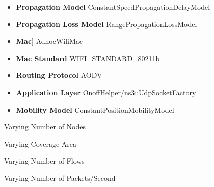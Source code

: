 \documentclass{article}[12pt]
\begin{document}
\begin{itemize}
	
	\item{\textbf{Propagation Model} ConstantSpeedPropagationDelayModel}
	\item{\textbf{Propagation Loss Model} RangePropagationLossModel}
	\item{\textbf{Mac}] AdhocWifiMac}
	\item{\textbf{Mac Standard} WIFI\_STANDARD\_80211b}
	\item{\textbf{Routing Protocol} AODV}
	\item{\textbf{Application Layer} OnoffHelper/ns3::UdpSocketFactory}
	\item{\textbf{Mobility Model} ConstantPositionMobilityModel}
	
\end{itemize}

\newpage
\vspace*{\fill}
\begin{center}
	\Large{Varying Number of Nodes}
\end{center}
\vspace*{\fill}








\vspace*{\fill}
\begin{center}
	\Large{Varying Coverage Area}
\end{center}
\vspace*{\fill}






\vspace*{\fill}
\begin{center}
	\Large{Varying Number of Flows}
\end{center}
\vspace*{\fill}






\vspace*{\fill}
\begin{center}
	\Large{Varying Number of Packets/Second}
\end{center}
\vspace*{\fill}
\end{document}
